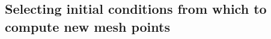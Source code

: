 \subsection{Selecting initial conditions from which to compute new mesh points}
\label{sub:selecting_initial_conditions_from_which_to_compute_new_mesh_points}


